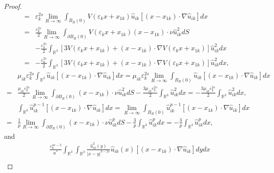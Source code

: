 \documentclass[reqno, 11pt]{amsart} %
\numberwithin{equation}{section}
\begin{document}
\begin{proof}
\begin{equation}
\begin{split}
				=&\varepsilon_{k}^{2s}\lim_{R\rightarrow\infty}\int_{ B_{R}(0)}V(\varepsilon_{k}x+x_{1k})\hat{u}_{ik}[(x-x_{1k})\cdot\nabla\hat{u}_{ik}]dx\\
				=&\frac{\varepsilon_{k}^{2s}}{2}\lim_{R\rightarrow\infty}\int_{\partial B_{R}(0)}V(\varepsilon_{k}x+x_{1k})(x-x_{1k})\cdot\nu\hat{u}_{ik}^{2}dS\\
				&-\frac{\varepsilon_{k}^{2s}}{2}\int_{\mathbb{R}^{3}}\left[3V(\varepsilon_{k}x+x_{1k})+(x-x_{1k})\cdot\nabla V(\varepsilon_{k}x+x_{1k})\right] \hat{u}_{ik}^{2}dx\\
				=&-\frac{\varepsilon_{k}^{2s}}{2}\int_{\mathbb{R}^{3}}\left[3V(\varepsilon_{k}x+x_{1k})+(x-x_{1k})\cdot\nabla V(\varepsilon_{k}x+x_{1k})\right] \hat{u}_{ik}^{2}dx,
			\end{split}
		\end{equation}
		\begin{equation}\label{equ4-32}
			\begin{split}
				&\mu_{ik}\varepsilon_{k}^{2s}\int_{\mathbb{R}^{3}}\hat{u}_{ik}[(x-x_{1k})\cdot\nabla\hat{u}_{ik}]dx=\mu_{ik}\varepsilon_{k}^{2s}\lim_{R\rightarrow\infty}\int_{ B_{R}(0)}\hat{u}_{ik}[(x-x_{1k})\cdot\nabla\hat{u}_{ik}]dx\\
				=&\frac{\mu_{ik}\varepsilon_{k}^{2s}}{2}\lim_{R\rightarrow\infty}\int_{\partial B_{R}(0)}(x-x_{1k})\cdot\nu\hat{u}_{ik}^{2}dS-\frac{3\mu_{ik}\varepsilon_{k}^{2s}}{2}\int_{\mathbb{R}^{3}}\hat{u}_{ik}^{2}dx=-\frac{3\mu_{ik}\varepsilon_{k}^{2s}}{2}\int_{\mathbb{R}^{3}}\hat{u}_{ik}^{2}dx,
			\end{split}
		\end{equation}
		\begin{equation}\label{equ4-33}
			\begin{split}
				&\int_{\mathbb{R}^{3}}\hat{u}_{ik}^{p-1}[(x-x_{1k})\cdot\nabla\hat{u}_{ik}]dx=\lim_{R\rightarrow\infty}\int_{ B_{R}(0)}\hat{u}_{ik}^{p-1}[(x-x_{1k})\cdot\nabla\hat{u}_{ik}]dx\\
				=&\frac{1}{p}\lim_{R\rightarrow\infty}\int_{\partial B_{R}(0)}(x-x_{1k})\cdot\nu\hat{u}_{ik}^{p}dS-\frac{3}{p}\int_{\mathbb{R}^{3}}\hat{u}_{ik}^{p}dx=-\frac{3}{p}\int_{\mathbb{R}^{3}}\hat{u}_{ik}^{p}dx,
			\end{split}
		\end{equation}
		and
		\begin{equation}\label{equ4-34}
			\begin{split}
				&\frac{\varepsilon_{k}^{4s-3}}{a^{\ast}}\int_{\mathbb{R}^{3}}\int_{\mathbb{R}^{3}}\frac{\hat{u}_{ik}^{2}(y)}{|x-y|^{3-2s}}\hat{u}_{ik}(x)[(x-x_{1k})\cdot\nabla\hat{u}_{ik}]dydx\\

\end{split}
\end{equation}
\end{proof}
\end{document}

